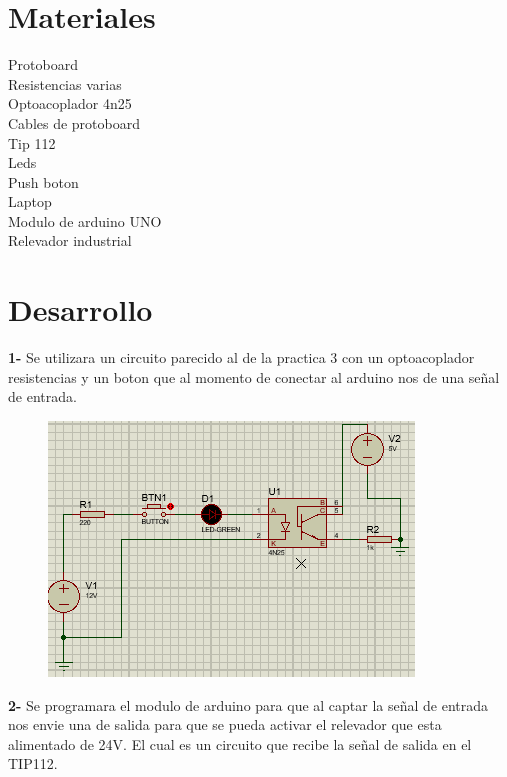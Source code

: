 \documentclass[12pt,a4paper]{article}
\begin{document}
\section{Materiales}
Protoboard\\Resistencias varias\\Optoacoplador 4n25\\Cables de protoboard\\Tip 112\\Leds\\Push boton\\Laptop\\Modulo de arduino UNO\\Relevador industrial

\section{Desarrollo}
\textbf{1-} Se utilizara un circuito parecido al de la practica 3 con un optoacoplador resistencias y un boton que al momento de conectar al arduino nos de una señal de entrada.
\begin{figure}[h!]
\centering
\includegraphics[scale=1]{Captura.PNG} 
\end{figure}

\textbf{2-} Se programara el modulo de arduino para que al captar la señal de entrada nos envie una de salida para que se pueda activar el relevador que esta alimentado de 24V. El cual es un circuito que recibe la señal de salida en el TIP112.
\newpage
\end{document}
